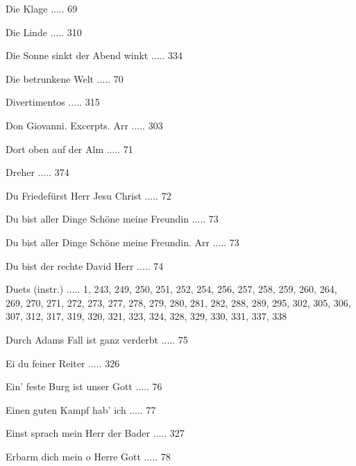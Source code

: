 \documentclass[twocolumn]{book}
\begin{document}
\newline 
Die Klage ..... 69

\newline 
Die Linde ..... 310

\newline 
Die Sonne sinkt der Abend winkt ..... 334

\newline 
Die betrunkene Welt ..... 70

\newline 
Divertimentos ..... 315

\newline 
Don Giovanni. Excerpts. Arr ..... 303

\newline 
Dort oben auf der Alm ..... 71

\newline 
Dreher ..... 374

\newline 
Du Friedefürst Herr Jesu Christ ..... 72

\newline 
Du bist aller Dinge Schöne meine Freundin ..... 73

\newline 
Du bist aller Dinge Schöne meine Freundin. Arr ..... 73

\newline 
Du bist der rechte David Herr ..... 74

\newline 
Duets (instr.) ..... 1, 243, 249, 250, 251, 252, 254, 256, 257, 258, 259, 260, 264, 269, 270, 271, 272, 273, 277, 278, 279, 280, 281, 282, 288, 289, 295, 302, 305, 306, 307, 312, 317, 319, 320, 321, 323, 324, 328, 329, 330, 331, 337, 338

\newline 
Durch Adams Fall ist ganz verderbt ..... 75

\newline 
Ei du feiner Reiter ..... 326

\newline 
Ein' feste Burg ist unser Gott ..... 76

\newline 
Einen guten Kampf hab' ich ..... 77

\newline 
Einst sprach mein Herr der Bader ..... 327

\newline 
Erbarm dich mein o Herre Gott ..... 78
\end{document}

